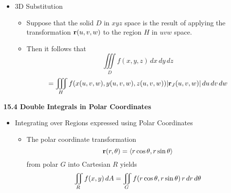 \begin{itemize}
  \newpage
    
  \item 3D Substitution
  
    \begin{itemize}
    \item Suppose that the solid $D$ in $xyz$ space is the result of applying the transformation $\mathbf{r}(u,v,w)$ to the region $H$ in $uvw$ space.
    \item Then it follows that \[\iiint\limits_D f(x,y,z)\,dx\,dy\,dz \]\[= \iiint\limits_H f(x(u,v,w),y(u,v,w),z(u,v,w))|\mathbf{r}_J(u,v,w)|\,du\,dv\,dw\]
    \end{itemize}
        
  
    
  \end{itemize}
  
\newpage

\centerline{\bf 15.4 Double Integrals in Polar Coordinates}
  
  \begin{itemize}
  
  \item Integrating over Regions expressed using Polar Coordinates
    
    \begin{itemize}
    \item The polar coordinate transformation \[\mathbf{r}(r,\theta) = \left<r\cos\theta, r\sin\theta\right>\] from polar $G$ into Cartesian $R$ yields \[\iint\limits_R f(x,y)\, dA = \iint\limits_G f(r\cos\theta,r\sin\theta)\,r\,d{r}\,d{\theta}\]
    \end{itemize}
      
  
    
  \end{itemize}
  
